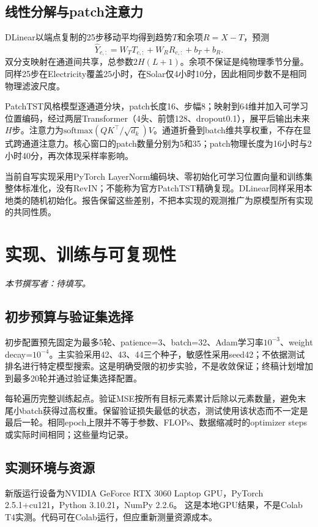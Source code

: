 \documentclass[10pt,a4paper]{article}
\begin{document}
\subsection{线性分解与patch注意力}
DLinear以端点复制的25步移动平均得到趋势$T$和余项$R=X-T$，预测
\[\hat Y_{c,:}=W_TT_{c,:}+W_RR_{c,:}+b_T+b_R.\]
双分支映射在通道间共享，总参数$2H(L+1)$。余项不保证是纯物理季节分量。同样25步在Electricity覆盖25小时，在Solar仅4小时10分，因此相同步数不是相同物理滤波尺度\cite{dlinear}。

PatchTST风格模型逐通道分块，patch长度16、步幅8；映射到64维并加入可学习位置编码，经过两层Transformer（4头、前馈128、dropout0.1），展平后输出未来$H$步。注意力为$\mathrm{softmax}(QK^\top/\sqrt{d_k})V$\cite{patch}。通道折叠到batch维共享权重，不存在显式跨通道注意力。核心窗口的patch数量分别为5和35；patch物理长度为16小时与2小时40分，再次体现采样率影响。

当前自写实现采用PyTorch LayerNorm编码块、零初始化可学习位置向量和训练集整体标准化，没有RevIN；不能称为官方PatchTST精确复现。DLinear同样采用本地类的随机初始化。报告保留这些差别，不把本实现的观测推广为原模型所有实现的共同性质。

\clearpage
\section{实现、训练与可复现性}
\noindent\textit{本节撰写者：待填写。}


\subsection{初步预算与验证集选择}
初步配置预先固定为最多5轮、patience=3、batch=32、Adam学习率$10^{-3}$、weight decay=$10^{-4}$。主实验采用42、43、44三个种子，敏感性采用seed42；不依据测试排名进行特定模型搜索。这是明确受限的初步实验，不是收敛保证；终稿计划增加到最多20轮并通过验证集选择配置。

每轮遍历完整训练起点。验证MSE按所有目标元素累计后除以元素数量，避免末尾小batch获得过高权重。保留验证损失最低的状态，测试使用该状态而不一定是最后一轮。相同epoch上限并不等于参数、FLOPs、数据缩减时的optimizer steps或实际时间相同；这些量均记录。
\subsection{实测环境与资源}
新版运行设备为NVIDIA GeForce RTX 3060 Laptop GPU，PyTorch 2.5.1+cu121，Python 3.10.21，NumPy 2.2.6。
这是本地GPU结果，不是Colab T4实测。代码可在Colab运行，但应重新测量资源成本。
\end{document}
